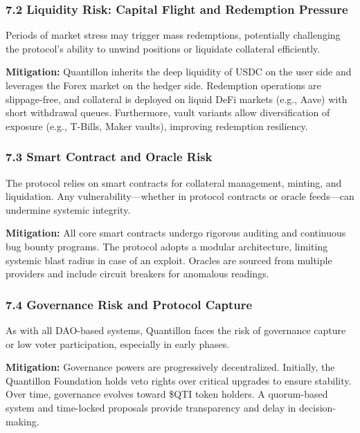 \hypertarget{liquidity-risk-capital-flight-and-redemption-pressure}{%
\subsubsection{7.2 Liquidity Risk: Capital Flight and Redemption
Pressure}\label{liquidity-risk-capital-flight-and-redemption-pressure}}

Periods of market stress may trigger mass redemptions, potentially
challenging the protocol's ability to unwind positions or liquidate
collateral efficiently.

\textbf{Mitigation:} Quantillon inherits the deep liquidity of USDC on
the user side and leverages the Forex market on the hedger side.
Redemption operations are slippage-free, and collateral is deployed on
liquid DeFi markets (e.g., Aave) with short withdrawal queues.
Furthermore, vault variants allow diversification of exposure (e.g.,
T-Bills, Maker vaults), improving redemption resiliency.

\hypertarget{smart-contract-and-oracle-risk}{%
\subsubsection{7.3 Smart Contract and Oracle
Risk}\label{smart-contract-and-oracle-risk}}

The protocol relies on smart contracts for collateral management,
minting, and liquidation. Any vulnerability---whether in protocol
contracts or oracle feeds---can undermine systemic integrity.

\textbf{Mitigation:} All core smart contracts undergo rigorous auditing
and continuous bug bounty programs. The protocol adopts a modular
architecture, limiting systemic blast radius in case of an exploit.
Oracles are sourced from multiple providers and include circuit breakers
for anomalous readings.

\hypertarget{governance-risk-and-protocol-capture}{%
\subsubsection{7.4 Governance Risk and Protocol
Capture}\label{governance-risk-and-protocol-capture}}

As with all DAO-based systems, Quantillon faces the risk of governance
capture or low voter participation, especially in early phases.

\textbf{Mitigation:} Governance powers are progressively decentralized.
Initially, the Quantillon Foundation holds veto rights over critical
upgrades to ensure stability. Over time, governance evolves toward \$QTI
token holders. A quorum-based system and time-locked proposals provide
transparency and delay in decision-making.

